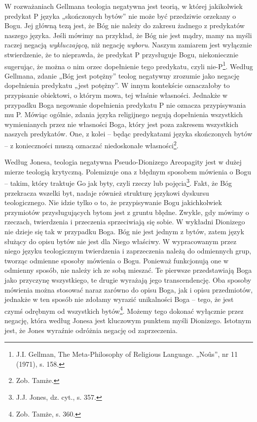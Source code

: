 W rozważaniach Gellmana teologia negatywna jest teorią, w której
jakikolwiek predykat P języka „skończonych bytów” nie może być
przedziwie orzekany o Bogu. Jej główną tezą jest, że Bóg nie należy do
zakresu żadnego z predykatów naszego języka. Jeśli mówimy na przykład,
że Bóg nie jest mądry, mamy na myśli raczej negacją
\textit{wykluczającą}, niż negację \textit{wyboru}. Naszym zamiarem
jest wyłącznie stwierdzenie, że to nieprawda, że predykat P przysługuje
Bogu, niekoniecznie sugerując, że można o nim orzec dopełnienie tego
predykatu, czyli nie-P\footnote{J.I. Gellman, The Meta-Philosophy of
Religious Language. „No\^us”, nr 11 (1971), s. 158. }. Według
Gellmana, zdanie „Bóg jest potężny” teolog negatywny zrozumie jako
negację dopełnienia predykatu „jest potężny”. W innym kontekście
oznaczałoby to przypisanie obiektowi, o którym mowa, tej właśnie
własności. Jednakże w przypadku Boga negowanie dopełnienia predykatu P
nie oznacza przypisywania mu P. Mówiąc ogólnie, zdania języka
religijnego negują dopełnienia wszystkich wymienianych przez nie
własności Boga, który jest poza zakresem wszystkich naszych predykatów.
One, z kolei -- będąc predykatami języka skończonych bytów -- z
konieczności muszą oznaczać niedoskonałe własności\footnote{Zob.
Tamże. }.

Według Jonesa, teologia negatywna Pseudo-Dionizego Areopagity jest w
dużej mierze teologią krytyczną. Polemizuje ona z błędnym sposobem
mówienia o Bogu -- takim, który traktuje Go jak byty, czyli rzeczy lub
pojęcia\footnote{J.J. Jones, dz. cyt., s. 357. }. Fakt, że Bóg
przekracza wszelki byt, nadaje również strukturę językowi dyskursu
teologicznego. Nie idzie tylko o to, że przypisywanie Bogu
jakichkolwiek przymiotów przysługujących bytom jest z gruntu błędne.
Zwykle, gdy mówimy o rzeczach, twierdzenia i przeczenia sprzeciwiają
się sobie. W wykładni Dionizego nie dzieje się tak w przypadku Boga.
Bóg nie jest jednym z bytów, zatem język służący do opisu bytów nie
jest dla Niego właściwy. W wypracowanym przez niego języku teologicznym
twierdzenia i zaprzeczenia należą do odmiennych grup, tworząc odmienne
sposoby mówienia o Bogu. Ponieważ funkcjonują one w odmienny sposób,
nie należy ich ze sobą mieszać. Te pierwsze przedstawiają Boga jako
przyczynę wszystkiego, te drugie wyrażają jego transcendencję. Oba
sposoby mówienia można stosować naraz zarówno do opisu Boga, jak i
opisu przedmiotów, jednakże w ten sposób nie zdołamy wyrazić
unikalności Boga -- tego, że jest czymś odrębnym od wszystkich
bytów\footnote{Zob. Tamże, s. 360. }. Możemy tego dokonać
wyłącznie przez negację, która według Jonesa jest kluczowym punktem
myśli Dionizego. Istotnym jest, że Jones wyraźnie odróżnia negację od
zaprzeczenia.



